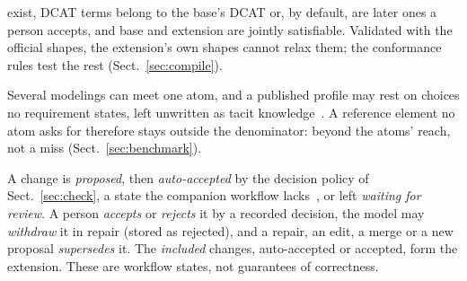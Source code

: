\begin{description}
  exist, \acs{DCAT} terms belong to the base's \acs{DCAT} or, by default, are later ones a person accepts, and base %
  and extension are jointly satisfiable. Validated with the official shapes, the extension's own shapes cannot %
  relax them; the conformance rules test the rest (Sect.~\ref{sec:compile}). %
\end{description}

Several modelings can meet one atom, and a published profile may rest on choices no requirement states, left %
unwritten as tacit knowledge~\cite{gervasi2013tacit}. A reference element no atom asks for therefore stays
outside the denominator: beyond the atoms' reach, not a miss (Sect.~\ref{sec:benchmark}).

A change is \emph{proposed}, then \emph{auto-accepted} by the decision policy of Sect.~\ref{sec:check}, a state %
the companion workflow lacks~\cite{anon2027rq1}, or left \emph{waiting for review}. A person \emph{accepts} or %
\emph{rejects} it by a recorded decision, the model may \emph{withdraw} it in repair (stored as rejected), and a %
repair, an edit, a merge or a new proposal \emph{supersedes} it. The \emph{included} changes, auto-accepted or %
accepted, form the extension. These are workflow states, not guarantees of correctness. %

